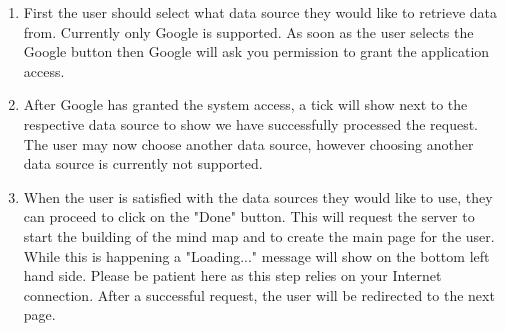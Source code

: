 \documentclass[hidelinks,english]{article}
\begin{document}
    	\begin{enumerate}  
            \item First the user should select what data source they would like to retrieve data from. Currently only Google is supported. As soon as the user selects the Google button then Google will ask you permission to grant the application access.
            \item After Google has granted the system access, a tick will show next to the respective data source to show we have successfully processed the request. The user may now choose another data source, however choosing another data source is currently not supported.
            \item When the user is satisfied with the data sources they would like to use, they can proceed to click on the "Done" button. This will request the server to start the building of the mind map and to create the main page for the user. While this is happening a "Loading..." message will show on the bottom left hand side. Please be patient here as this step relies on your Internet connection. After a successful request, the user will be redirected to the next page.
        \end{enumerate}
\end{document}
